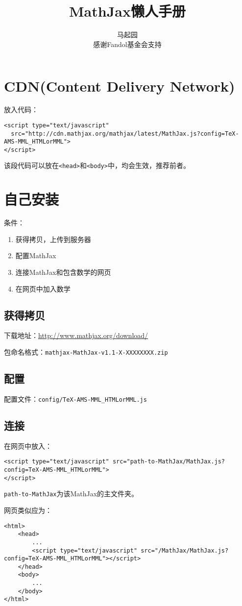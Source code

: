 \documentclass{article}
\begin{document}
\title{MathJax懒人手册}
\author{马起园\\
感谢Fandol基金会支持}
\date{}
\maketitle
\section{CDN(Content Delivery Network)}
放入代码：
\begin{verbatim}
<script type="text/javascript"
  src="http://cdn.mathjax.org/mathjax/latest/MathJax.js?config=TeX-AMS-MML_HTMLorMML">
</script>
\end{verbatim}
该段代码可以放在\verb!<head>!和\verb!<body>!中，均会生效，推荐前者。
\section{自己安装}
条件：
\begin{enumerate}
\item 获得拷贝，上传到服务器
\item 配置MathJax
\item 连接MathJax和包含数学的网页
\item 在网页中加入数学
\end{enumerate}
\subsection{获得拷贝}
下载地址：\url{http://www.mathjax.org/download/}

包命名格式：\verb!mathjax-MathJax-v1.1-X-XXXXXXXX.zip!
\subsection{配置}
配置文件：\verb!config/TeX-AMS-MML_HTMLorMML.js!
\subsection{连接}
在网页中放入：
\begin{verbatim}
<script type="text/javascript" src="path-to-MathJax/MathJax.js?config=TeX-AMS-MML_HTMLorMML">
</script>
\end{verbatim}
\verb!path-to-MathJax!为该MathJax的主文件夹。

网页类似应为：
\begin{verbatim}
<html>
    <head>
        ...
        <script type="text/javascript" src="/MathJax/MathJax.js?config=TeX-AMS-MML_HTMLorMML"></script>
    </head>
    <body>
        ...
    </body>
</html>
\end{verbatim}
\end{document}
